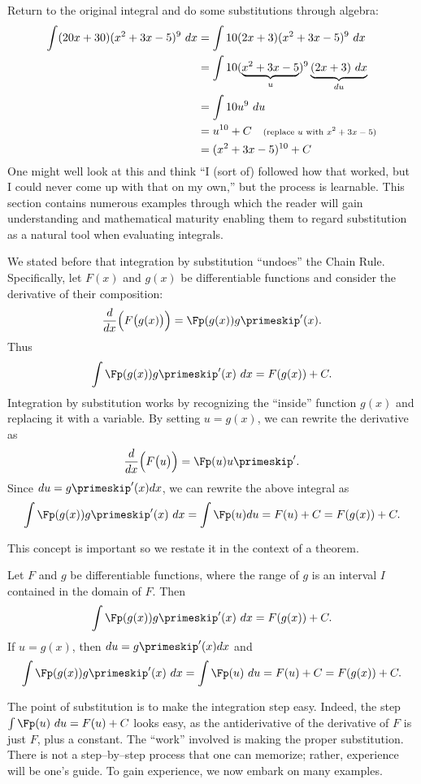 Return to the original integral and do some substitutions through algebra:
\begin{align*}
	\int (20x+30)(x^2+3x-5)^9\ dx 	&=	\int 10(2x+3)(x^2+3x-5)^9\ dx \\
									&=\int 10(\underbrace{x^2+3x-5}_u)^9\underbrace{(2x+3)\ dx}_{du} \\
									&=\int 10u^9\ du \\
									&= u^{10} + C \quad \text{\scriptsize (replace $u$ with $x^2+3x-5$)}\\
									&= (x^2+3x-5)^{10} +C
\end{align*}
One might well look at this and think ``I (sort of) followed how that worked, but I could never come up with that on my own,'' but the process is learnable. This section contains numerous examples through which the reader will gain understanding and mathematical maturity enabling them to regard substitution as a natural tool when evaluating integrals.

We stated before that integration by substitution ``undoes'' the Chain Rule. Specifically, let $F(x)$ and $g(x)$ be differentiable functions and consider the derivative of their composition: 
	$$\frac{d}{dx}\Big(F\big(g(x)\big)\Big) = \Fp(g(x))g\primeskip'(x).$$ Thus 
	$$\int \Fp(g(x))g\primeskip'(x)\ dx = F(g(x)) + C.$$
Integration by substitution works by recognizing the ``inside'' function $g(x)$ and replacing it with a variable. By setting $u=g(x)$, we can rewrite the derivative as
	$$\frac{d}{dx}\Big(F\big(u\big)\Big) = \Fp(u)u\primeskip'.$$
Since $du = g\primeskip'(x)dx$, we can rewrite the above integral as
	$$\int \Fp(g(x))g\primeskip'(x)\ dx = \int \Fp(u) du = F(u)+C = F(g(x))+ C.$$
	
This concept is important so we restate it in the context of a theorem.

{Let $F$ and $g$ be differentiable functions, where the range of $g$ is an interval $I$ contained in the domain of $F$. Then 
	$$\int \Fp(g(x))g\primeskip'(x)\ dx = F(g(x)) + C.$$
If $u = g(x)$, then $du = g\primeskip'(x)dx$ and 
	$$\int \Fp(g(x))g\primeskip'(x)\ dx = \int \Fp(u)\ du = F(u)+C = F(g(x))+C.$$
}

The point of substitution is to make the integration step easy. Indeed, the step $\int \Fp(u)\ du = F(u) + C$ looks easy, as the antiderivative of the derivative of $F$ is just $F$, plus a constant. The ``work'' involved is making the proper substitution. There is not a step--by--step process that one can memorize; rather, experience will be one's guide. To gain experience, we now embark on many examples.\\

